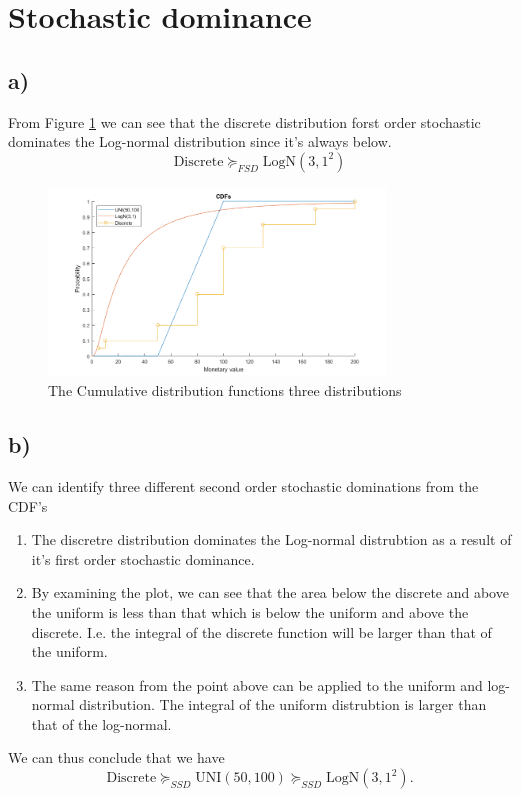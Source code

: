 \documentclass{article}
\begin{document}
\section{Stochastic dominance}
\subsection{a)}
	From Figure \ref{fig:5} we can see that the discrete distribution forst order stochastic dominates the Log-normal distribution since it's always below.
	\begin{equation}
		\text{Discrete}  \succcurlyeq_{FSD} \text{LogN}(3,1^2)
	\end{equation}
	\begin{figure}[H]
		\includegraphics[width=0.8\textwidth]{5.png}
		\caption{The Cumulative distribution functions three distributions}
		\label{fig:5}
	\end{figure}
\subsection{b)}
	We can identify three different second order stochastic dominations from the CDF's
	\begin{enumerate}
		\item The discretre distribution dominates the Log-normal distrubtion as a result of it's first order stochastic dominance.
		\item By examining the plot, we can see that the area below the discrete and above the uniform is less than that which is below the uniform and above the discrete. I.e. the integral of the discrete function will be larger than that of the uniform.
		\item  The same reason from the point above can be applied to the uniform and log-normal distribution. The integral of the uniform distrubtion is larger than that of the log-normal.
	\end{enumerate}
		We can thus conclude that we have
		\begin{equation}
			\text{Discrete} \succcurlyeq_{SSD} \text{UNI}(50,100) \succcurlyeq_{SSD} \text{LogN}(3,1^2).
		\end{equation}
\end{document}
